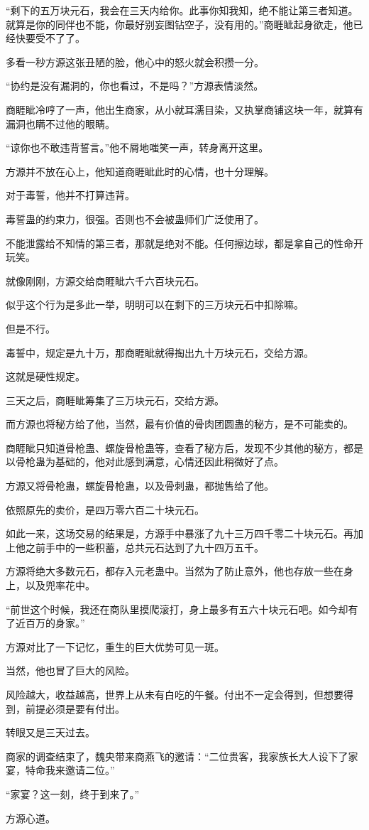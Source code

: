 \begin{this_body}
“剩下的五万块元石，我会在三天内给你。此事你知我知，绝不能让第三者知道。就算是你的同伴也不能，你最好别妄图钻空子，没有用的。”商睚眦起身欲走，他已经快要受不了了。

多看一秒方源这张丑陋的脸，他心中的怒火就会积攒一分。

“协约是没有漏洞的，你也看过，不是吗？”方源表情淡然。

商睚眦冷哼了一声，他出生商家，从小就耳濡目染，又执掌商铺这块一年，就算有漏洞也瞒不过他的眼睛。

“谅你也不敢违背誓言。”他不屑地嗤笑一声，转身离开这里。

方源并不放在心上，他知道商睚眦此时的心情，也十分理解。

对于毒誓，他并不打算违背。

毒誓蛊的约束力，很强。否则也不会被蛊师们广泛使用了。

不能泄露给不知情的第三者，那就是绝对不能。任何擦边球，都是拿自己的性命开玩笑。

就像刚刚，方源交给商睚眦六千六百块元石。

似乎这个行为是多此一举，明明可以在剩下的三万块元石中扣除嘛。

但是不行。

毒誓中，规定是九十万，那商睚眦就得掏出九十万块元石，交给方源。

这就是硬性规定。

三天之后，商睚眦筹集了三万块元石，交给方源。

而方源也将秘方给了他，当然，最有价值的骨肉团圆蛊的秘方，是不可能卖的。

商睚眦只知道骨枪蛊、螺旋骨枪蛊等，查看了秘方后，发现不少其他的秘方，都是以骨枪蛊为基础的，他对此感到满意，心情还因此稍微好了点。

方源又将骨枪蛊，螺旋骨枪蛊，以及骨刺蛊，都抛售给了他。

依照原先的卖价，是四万零六百二十块元石。

如此一来，这场交易的结果是，方源手中暴涨了九十三万四千零二十块元石。再加上他之前手中的一些积蓄，总共元石达到了九十四万五千。

方源将绝大多数元石，都存入元老蛊中。当然为了防止意外，他也存放一些在身上，以及兜率花中。

“前世这个时候，我还在商队里摸爬滚打，身上最多有五六十块元石吧。如今却有了近百万的身家。”

方源对比了一下记忆，重生的巨大优势可见一斑。

当然，他也冒了巨大的风险。

风险越大，收益越高，世界上从未有白吃的午餐。付出不一定会得到，但想要得到，前提必须是要有付出。

转眼又是三天过去。

商家的调查结束了，魏央带来商燕飞的邀请：“二位贵客，我家族长大人设下了家宴，特命我来邀请二位。”

“家宴？这一刻，终于到来了。”

方源心道。

\end{this_body}

